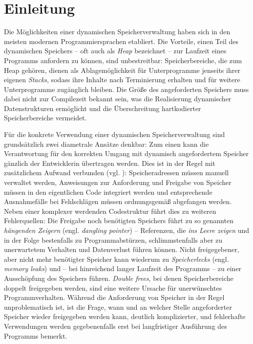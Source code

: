 \chapter{Einleitung}
\label{cha:intro}

Die Möglichkeiten einer dynamischen Speicherverwaltung haben sich in den meisten modernen Programmiersprachen etabliert.
Die Vorteile, einen Teil des dynamischen Speichers -- oft auch als \textit{Heap} bezeichnet -- zur Laufzeit eines Programms anfordern zu können, sind unbestreitbar:
Speicherbereiche, die zum Heap gehören, dienen als Ablagemöglichkeit für Unterprogramme jenseits ihrer eigenen \textit{Stacks}, sodass ihre Inhalte nach Terminierung erhalten und für weitere Unterprogramme zugänglich bleiben.
Die Größe des angeforderten Speichers muss dabei nicht zur Compilezeit bekannt sein, was die Realisierung dynamischer Datenstrukturen ermöglicht und die Überschreitung hartkodierter Speicherbereiche vermeidet.

Für die konkrete Verwendung einer dynamischen Speicherverwaltung sind grundsätzlich zwei diametrale Ansätze denkbar:
Zum einen kann die Verantwortung für den korrekten Umgang mit dynamisch angefordertem Speicher gänzlich der Entwicklerin übertragen werden.
Dies ist in der Regel mit zusätzlichem Aufwand verbunden (vgl. \cite[S. 1f]{wilson1992}):
Speicheradressen müssen manuell verwaltet werden, Anweisungen zur Anforderung und Freigabe von Speicher müssen in den eigentlichen Code integriert werden und entsprechende Ausnahmefälle bei Fehlschlägen müssen ordnungsgemäß abgefangen werden.
Neben einer komplexer werdenden Codestruktur führt dies zu weiteren Fehlerquellen:
Die Freigabe noch benötigten Speichers führt zu so genannten \textit{hängenden Zeigern} (engl. \textit{dangling pointer}) -- Referenzen, die \textit{ins Leere zeigen} und in der Folge bestenfalls zu Programmabstürzen, schlimmstenfalls aber zu unerwartetem Verhalten und Datenverlust führen können.
Nicht freigegebener, aber nicht mehr benötigter Speicher kann wiederum zu \textit{Speicherlecks} (engl. \textit{memory leaks}) und -- bei hinreichend langer Laufzeit des Programms -- zu einer Ausschöpfung des Speichers führen.
\textit{Double frees}, bei denen Speicherbereiche doppelt freigegeben werden, sind eine weitere Ursache für unerwünschtes Programmverhalten.
Während die Anforderung von Speicher in der Regel unproblematisch ist, ist die Frage, wann und an welcher Stelle angeforderter Speicher wieder freigegeben werden kann, deutlich komplizierter, und fehlerhafte Verwendungen werden gegebenenfalls erst bei langfristiger Ausführung des Programms bemerkt.

